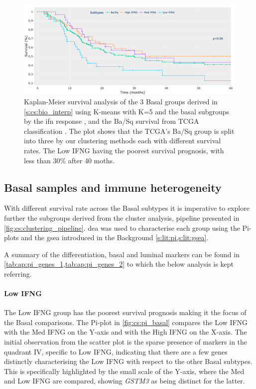 \begin{figure}[!htb]    
    \centering
    \includegraphics[width=1.0\textwidth,keepaspectratio]{Sections/ClusteringAnalysis/Resources/discussion/survival_basal.png}
    \centering
    \caption[New Basal subgroups and their survival prognosis]{Kaplan-Meier survival analysis of the 3 Basal groups derived in \cref{s:cs:bio_interp} using K-means with K=5 and the basal subgroups by the \acrshort{ifn} response \citep{Baker2022-bj}, and the Ba/Sq survival from TCGA classification \citep{Robertson2017-mg}. The plot shows that the TCGA's Ba/Sq group is split into three by our clustering methods each with different survival rates. The Low IFNG having the poorest survival prognosis, with less than 30\% after 40 moths.}
    \label{fig:cs:basal_survival}
\end{figure}

\subsection{Basal samples and immune heterogeneity} \label{s:cs:basal_interp}

With different survival rate across the Basal subtypes it is imperative to explore further the subgroups derived from the cluster analysis, pipeline presented in \cref{fig:cs:clustering_pipeline}. \acrlong{dea} was used to characterise each group using the Pi-plots and the \acrlong{gsea} introduced in the Background \cref{s:lit:pi,s:lit:gsea}. 

A summary of the differentiation, basal and luminal markers can be found in \cref{tab:ap:pi_genes_1,tab:ap:pi_genes_2} to which the below analysis is kept referring.

\paragraph*{Low IFNG}

The Low IFNG group has the poorest survival prognosis making it the focus of the Basal comparisons. The Pi-plot in \cref{fig:cs:pi_basal} compares the Low IFNG with the Med IFNG on the Y-axis and with the High IFNG on the X-axis. The initial observation from the scatter plot is the sparse presence of markers in the quadrant IV, specific to Low IFNG, indicating that there are a few genes distinctly characterising the Low IFNG with respect to the other Basal subtypes. This is specifically highlighted by the small scale of the Y-axis, where the Med and Low IFNG are compared, showing \textit{GSTM3} as being distinct for the latter.

